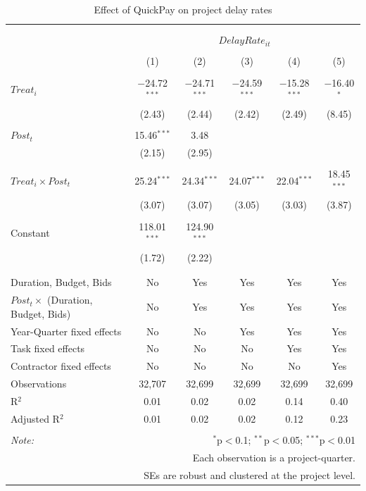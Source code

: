 \documentclass[
]{article}
\begin{document}
\begin{table}[H] \centering 
  \caption{Effect of QuickPay on project delay rates} 
  \label{} 
\small 
\begin{tabular}{@{\extracolsep{-2pt}}lccccc} 
\\[-1.8ex]\hline 
\hline \\[-1.8ex] 
\\[-1.8ex] & \multicolumn{5}{c}{$DelayRate_{it}$} \\ 
\\[-1.8ex] & (1) & (2) & (3) & (4) & (5)\\ 
\hline \\[-1.8ex] 
 $Treat_i$ & $-$24.72$^{***}$ & $-$24.71$^{***}$ & $-$24.59$^{***}$ & $-$15.28$^{***}$ & $-$16.40$^{*}$ \\ 
  & (2.43) & (2.44) & (2.42) & (2.49) & (8.45) \\ 
  & & & & & \\ 
 $Post_t$ & 15.46$^{***}$ & 3.48 &  &  &  \\ 
  & (2.15) & (2.95) &  &  &  \\ 
  & & & & & \\ 
 $Treat_i \times Post_t$ & 25.24$^{***}$ & 24.34$^{***}$ & 24.07$^{***}$ & 22.04$^{***}$ & 18.45$^{***}$ \\ 
  & (3.07) & (3.07) & (3.05) & (3.03) & (3.87) \\ 
  & & & & & \\ 
 Constant & 118.01$^{***}$ & 124.90$^{***}$ &  &  &  \\ 
  & (1.72) & (2.22) &  &  &  \\ 
  & & & & & \\ 
\hline \\[-1.8ex] 
Duration, Budget, Bids & No & Yes & Yes & Yes & Yes \\ 
$Post_t \times$  (Duration, Budget, Bids) & No & Yes & Yes & Yes & Yes \\ 
Year-Quarter fixed effects & No & No & Yes & Yes & Yes \\ 
Task fixed effects & No & No & No & Yes & Yes \\ 
Contractor fixed effects & No & No & No & No & Yes \\ 
Observations & 32,707 & 32,699 & 32,699 & 32,699 & 32,699 \\ 
R$^{2}$ & 0.01 & 0.02 & 0.02 & 0.14 & 0.40 \\ 
Adjusted R$^{2}$ & 0.01 & 0.02 & 0.02 & 0.12 & 0.23 \\ 
\hline 
\hline \\[-1.8ex] 
\textit{Note:}  & \multicolumn{5}{r}{$^{*}$p$<$0.1; $^{**}$p$<$0.05; $^{***}$p$<$0.01} \\ 
 & \multicolumn{5}{r}{Each observation is a project-quarter.} \\ 
 & \multicolumn{5}{r}{SEs are robust and clustered at the project level.} \\ 
\end{tabular} 
\end{table}
\end{document}
